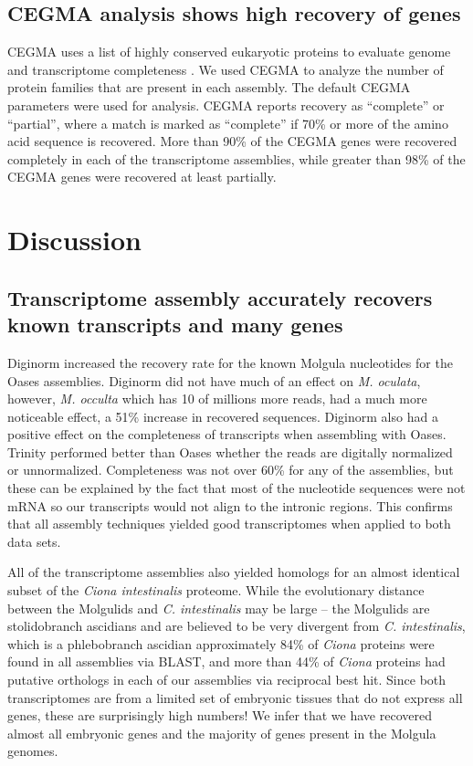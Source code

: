 \documentclass[fleqn,10pt]{wlpeerj}
\begin{document}
\subsection{CEGMA analysis shows high recovery of genes}
CEGMA uses a list of highly conserved eukaryotic proteins to evaluate genome and transcriptome completeness \citep{parra_cegma:_2007}. We used CEGMA to analyze the number of protein families that are present in each assembly. The default CEGMA parameters were used for analysis. CEGMA reports recovery as ``complete'' or ``partial'', where a match is marked as ``complete'' if 70\% or more of the amino acid sequence is recovered. More than 90\% of the CEGMA genes were recovered completely in each of the transcriptome assemblies, while greater than 98\% of the CEGMA genes were recovered at least partially. 

\section{Discussion}

\subsection{Transcriptome assembly accurately recovers known transcripts and many genes}
Diginorm increased the recovery rate for the known Molgula nucleotides for the Oases assemblies. Diginorm did not have much of an effect on \textit{M. oculata}, however, \textit{M. occulta} which has 10 of millions more reads, had a much more noticeable effect, a 51\% increase in recovered sequences. Diginorm also had a positive effect on the completeness of transcripts when assembling with Oases. Trinity performed better than Oases whether the reads are digitally normalized or unnormalized. Completeness was not over 60\% for any of the assemblies, but these can be explained by the fact that most of the nucleotide sequences were not mRNA so our transcripts would not align to the intronic regions. This confirms that all assembly techniques yielded good transcriptomes when applied to both data sets.

All of the transcriptome assemblies also yielded homologs for an almost identical subset of the \textit{Ciona intestinalis} proteome.  While the evolutionary distance between the Molgulids and \textit{C. intestinalis} may be large -- the Molgulids are stolidobranch ascidians and are believed to be very divergent from \textit{C. intestinalis}, which is a phlebobranch ascidian \citep{huber_evolution_2000, stach_phylogeny_2002}\textemdash approximately 84\% of \textit{Ciona} proteins were found in all assemblies via BLAST, and more than 44\% of \textit{Ciona} proteins had putative orthologs in each of our assemblies via reciprocal best hit.  Since both transcriptomes are from a limited set of embryonic tissues that do not express all genes, these are surprisingly high numbers!  We infer that we have recovered almost all embryonic genes and the majority of genes present in the Molgula genomes.
\end{document}
